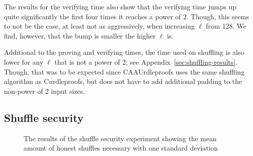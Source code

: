 The results for the verifying time also show that the verifying time jumps up quite significantly the first four times it reaches a power of 2.
Though, this seems to not be the case, at least not as aggressively, when increasing $\ell$ from 128.
We find, however, that the bump is smaller the higher $\ell$ is.

Additional to the proving and verifying times, the time used on shuffling is also lower for any $\ell$ that is not a power of 2; see Appendix~\ref{sec:shuffling-results}.
Though, that was to be expected since CAAUrdleproofs uses the same shuffling algorithm as Curdleproofs, but does not have to add additional padding to the non-power of 2 input sizes.



\subsection{Shuffle security}\label{subsec:Shuffle-security}

\begin{figure}[!htb]
    \centering
    \caption{The results of the shuffle security experiment showing the mean amount of honest shuffles necessary with one standard deviation}%
    \label{fig:shufflesecurity}%
\end{figure}

